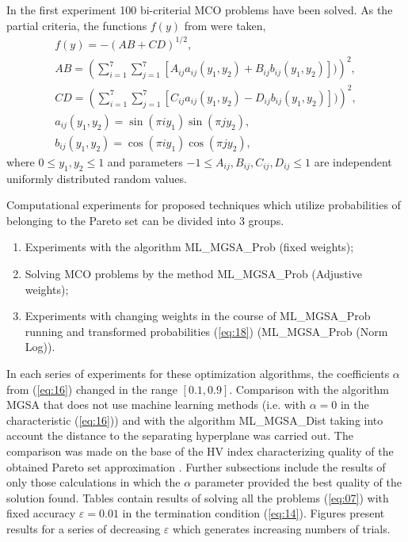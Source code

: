 \documentclass[runningheads]{llncs}
\begin{document}
In the first experiment 100 bi-criterial MCO problems have been solved. As the partial criteria, the functions $f(y)$ from \cite{ML_MCO_2023} were taken,
\begin{equation}
    \label{eq:19}
		\begin{matrix}
		  f(y)= -(AB + CD)^{1/2}, \\
			AB =(\sum_{i=1}^7{\sum_{j=1}^7{[A_{ij} a_{ij} (y_1,y_2) + B_{ij} b_{ij} (y_1,y_2)])}})^2, \\
			CD =(\sum_{i=1}^7{\sum_{j=1}^7{[C_{ij} a_{ij} (y_1,y_2) - D_{ij} b_{ij} (y_1,y_2)])}})^2, \\
			a_{ij} (y_1,y_2) = \sin(\pi i y_1) \sin(\pi j y_2), \\
			b_{ij} (y_1,y_2) = \cos(\pi i y_1) \cos(\pi j y_2),
		\end{matrix}
\end{equation}
where $0 \leq y_1, y_2 \leq 1$ and parameters $-1 \leq A_{ij},B_{ij},C_{ij},D_{ij} \leq 1$ are independent uniformly distributed random values.

Computational experiments for proposed techniques which utilize probabilities of belonging to the Pareto set can be divided into 3 groups.
\begin{enumerate}
	\item 	Experiments with the algorithm ML\_MGSA\_Prob (fixed weights);
	\item 	Solving MCO problems by the method ML\_MGSA\_Prob (Adjustive weights);
	\item 	Experiments with changing weights in the course of ML\_MGSA\_Prob running and transformed probabilities (\ref{eq:18})  (ML\_MGSA\_Prob (Norm Log)).
\end{enumerate}
	
In each series of experiments for these optimization algorithms, the coefficients $\alpha$ from (\ref{eq:16}) changed in the range $[0.1, 0.9]$. Comparison with the algorithm MGSA that does not use machine learning methods (i.e. with $\alpha = 0$ in the characteristic (\ref{eq:16})) and with the algorithm ML\_MGSA\_Dist taking into account the distance to the separating hyperplane was carried out. The comparison was made on the base of  the HV index characterizing quality of the obtained Pareto set approximation \cite{ML_MCO_2023,Evtushenko2014}. Further subsections include the results of only those calculations in which the $\alpha$ parameter provided the best quality of the solution found. Tables contain results of solving all the problems (\ref{eq:07}) with fixed accuracy $\varepsilon=0.01$ in the termination condition (\ref{eq:14}). Figures present results for a series of decreasing $\varepsilon$ which generates increasing numbers of trials.
\end{document}
